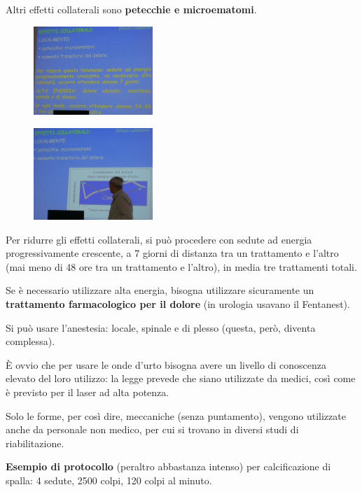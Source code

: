 Altri effetti collaterali sono \textbf{petecchie e microematomi}.

\begin{figure}[!ht]
\centering
\includegraphics[width=0.4\textwidth]{025/image23.jpeg}
\end{figure}

\begin{figure}[!ht]
\centering
\includegraphics[width=0.4\textwidth]{025/image24.jpeg}
\end{figure}

Per ridurre gli effetti collaterali, si può procedere con sedute ad
energia progressivamente crescente, a 7 giorni di distanza tra un
trattamento e l'altro (mai meno di 48 ore tra un trattamento e l'altro),
in media tre trattamenti totali.

Se è necessario utilizzare alta energia, bisogna utilizzare sicuramente
un \textbf{trattamento farmacologico per il dolore} (in urologia usavano
il Fentanest).

Si può usare l'anestesia: locale, spinale e di plesso (questa, però,
diventa complessa).

È ovvio che per usare le onde d'urto bisogna avere un livello di
conoscenza elevato del loro utilizzo: la legge prevede che siano
utilizzate da medici, così come è previsto per il laser ad alta potenza.

Solo le forme, per così dire, meccaniche (senza puntamento), vengono
utilizzate anche da personale non medico, per cui si trovano in diversi
studi di riabilitazione.

\textbf{Esempio di protocollo} (peraltro abbastanza intenso) per
calcificazione di spalla: 4 sedute, 2500 colpi, 120 colpi al minuto.

